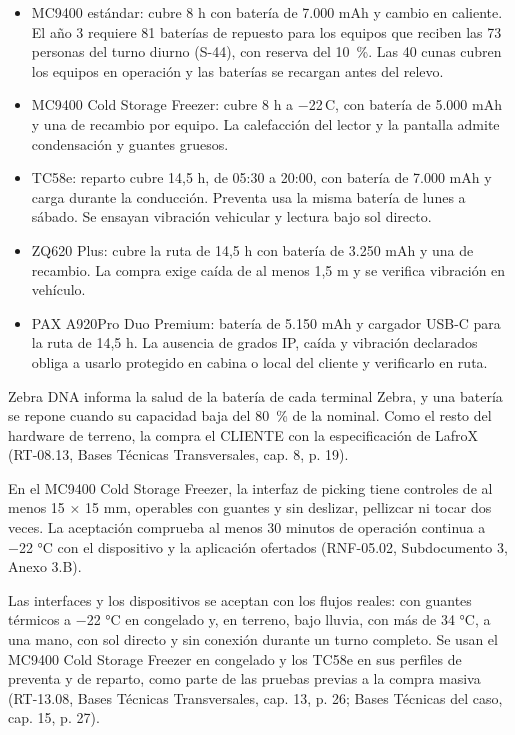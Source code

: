 \begin{itemize}
  \item MC9400 estándar: cubre 8 h con batería de 7.000 mAh y cambio en caliente. El año 3 requiere 81 baterías de repuesto para los equipos que reciben las 73 personas del turno diurno (S-44), con reserva del 10~\%. Las 40 cunas cubren los equipos en operación y las baterías se recargan antes del relevo.
  \item MC9400 Cold Storage Freezer: cubre 8 h a $-$22\,\textdegree{}C, con batería de 5.000 mAh y una de recambio por equipo. La calefacción del lector y la pantalla admite condensación y guantes gruesos.
  \item TC58e: reparto cubre 14,5 h, de 05:30 a 20:00, con batería de 7.000 mAh y carga durante la conducción. Preventa usa la misma batería de lunes a sábado. Se ensayan vibración vehicular y lectura bajo sol directo.
  \item ZQ620 Plus: cubre la ruta de 14,5 h con batería de 3.250 mAh y una de recambio. La compra exige caída de al menos 1,5 m y se verifica vibración en vehículo.
  \item PAX A920Pro Duo Premium: batería de 5.150 mAh y cargador USB-C para la ruta de 14,5 h. La ausencia de grados IP, caída y vibración declarados obliga a usarlo protegido en cabina o local del cliente y verificarlo en ruta.
\end{itemize}

Zebra DNA informa la salud de la batería de cada terminal Zebra, y una batería se repone cuando su capacidad baja del 80~\% de la nominal. Como el resto del hardware de terreno, la compra el CLIENTE con la especificación de LafroX (RT-08.13, Bases Técnicas Transversales, cap. 8, p. 19).

En el MC9400 Cold Storage Freezer, la interfaz de picking tiene controles de al menos 15 × 15 mm, operables con guantes y sin deslizar, pellizcar ni tocar dos veces. La aceptación comprueba al menos 30 minutos de operación continua a −22 °C con el dispositivo y la aplicación ofertados (RNF-05.02, Subdocumento 3, Anexo 3.B).

Las interfaces y los dispositivos se aceptan con los flujos reales: con guantes térmicos a −22 °C en congelado y, en terreno, bajo lluvia, con más de 34 °C, a una mano, con sol directo y sin conexión durante un turno completo. Se usan el MC9400 Cold Storage Freezer en congelado y los TC58e en sus perfiles de preventa y de reparto, como parte de las pruebas previas a la compra masiva (RT-13.08, Bases Técnicas Transversales, cap. 13, p. 26; Bases Técnicas del caso, cap. 15, p. 27).

